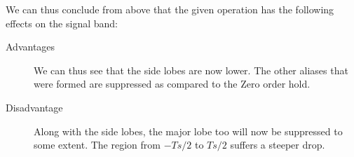 We can thus conclude from above that the given operation has the following effects on the signal band:

\begin{description}
\item[Advantages] We can thus see that the side lobes are now lower. The other aliases that were formed are suppressed as compared to the Zero order hold.

\item[Disadvantage] Along with the side lobes, the major lobe too will now be suppressed to some extent. The region from $-Ts/2$ to $Ts/2$ suffers a steeper drop.  
\end{description}






